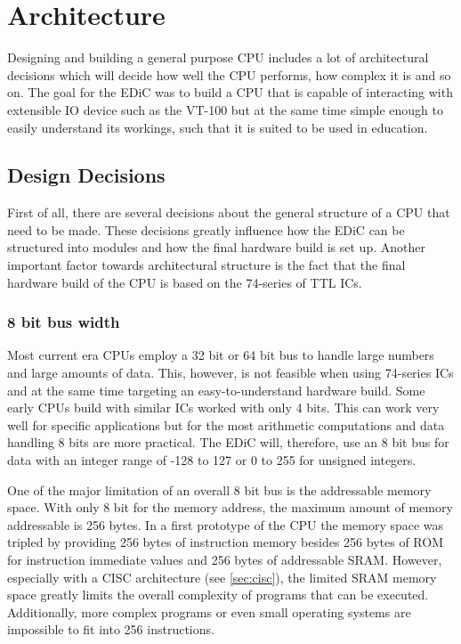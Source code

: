 \chapter{Architecture}\label{cha:architecture}
Designing and building a general purpose \gls{CPU} includes a lot of architectural decisions which will decide how well the \gls{CPU} performs, how complex it is and so on.
The goal for the \gls{EDiC} was to build a \gls{CPU} that is capable of interacting with extensible \gls{IO} device such as the VT-100 but at the same time simple enough to easily understand its workings, such that it is suited to be used in education.

\section{Design Decisions}
First of all, there are several decisions about the general structure of a \gls{CPU} that need to be made.
These decisions greatly influence how the \gls{EDiC} can be structured into modules and how the final hardware build is set up.
Another important factor towards architectural structure is the fact that the final hardware build of the \gls{CPU} is based on the 74-series of \gls{TTL} \glspl{IC}.

\subsection{8 bit bus width}
Most current era \glspl{CPU} employ a 32 bit or 64 bit bus to handle large numbers and large amounts of data.
This, however, is not feasible when using 74-series \glspl{IC} and at the same time targeting an easy-to-understand hardware build.
Some early \glspl{CPU} build with similar \glspl{IC} worked with only 4 bits.
This can work very well for specific applications but for the most arithmetic computations and data handling 8 bits are more practical.
The \gls{EDiC} will, therefore, use an 8 bit bus for data with an integer range of -128 to 127 or 0 to 255 for unsigned integers.

One of the major limitation of an overall 8 bit bus is the addressable memory space.
With only 8 bit for the memory address, the maximum amount of memory addressable is 256 bytes.
In a first prototype of the \gls{CPU} the memory space was tripled by providing 256 bytes of instruction memory besides 256 bytes of \gls{ROM} for instruction immediate values and 256 bytes of addressable \gls{SRAM}.
However, especially with a \gls{CISC} architecture (see \cref{sec:cisc}), the limited \gls{SRAM} memory space greatly limits the overall complexity of programs that can be executed.
Additionally, more complex programs or even small operating systems are impossible to fit into 256 instructions.

